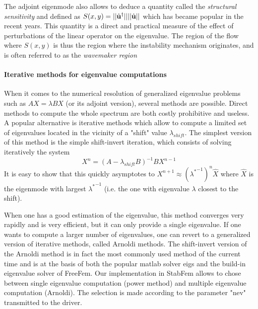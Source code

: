 \documentclass[twocolumn,10pt]{asme2ej}
\begin{document}
The adjoint eigenmode also allows to deduce a quantity called the {\em structural sensitivity}  and defined as $S(x,y) = || \hat{\bf u}^\dag||  ||\hat{\bf u}||$ which has became popular in the recent years.
This quantity is a direct and practical measure of the effect of perturbations of the linear operator on the eigenvalue. The region of the flow where $S(x,y)$ is thus the region where the instability mechanism originates, and is often referred to as the {\em wavemaker region}


\paragraph{Iterative methods for eigenvalue computations}

When it comes to the numerical resolution of generalized eigenvalue problems such as $A X = \lambda B X$ (or its adjoint version), several methods are possible. Direct methods to compute the whole spectrum are both costly prohibitive and useless. A popular alternative is iterative methods which allow to compute a limited set of eigenvalues located in the vicinity of a 
"shift" value $\lambda_{shift}$. The simplest version of this method is the simple shift-invert iteration, which consists of solving iteratively the system
$$
X^{n} =  (A- \lambda_{shift} B)^{-1} B X^{n-1}
$$ 
It is easy to show that this quickly asymptotes to $X^{n+1} \approx ({\lambda^*}^{-1})^n \hat{X}$
where $\hat{X}$ is the eigenmode with largest ${\lambda^*}^{-1}$ (i.e. the one with eigenvalue $\lambda$ closest to the shift). 


When one has a good estimation of the eigenvalue, this method converges very rapidly and is very efficient, but it can only provide a single eigenvalue.
If one wants to compute a larger number of eigenvalues, one can revert to a generalized version of iterative methods, called Arnoldi methods. The shift-invert version of the Arnoldi method is in fact the most commonly  used method of the current time and is at the basis of both the popular matlab solver eigs and the build-in eigenvalue solver of FreeFem. Our implementation in StabFem allows to chose between single eigenvalue computation (power method) and multiple eigenvalue computation (Arnoldi). The selection is made according to the parameter "nev" transmitted to the driver.
\end{document}
